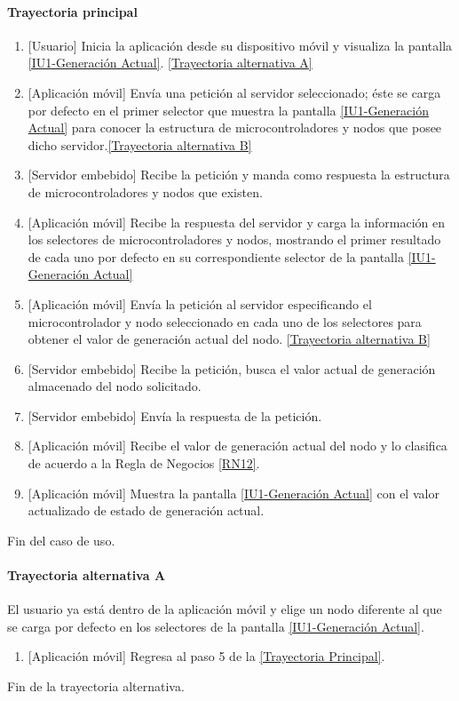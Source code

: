 \paragraph{Trayectoria principal}
    \label{SUB-U-CU1.1:TP}
	\begin{enumerate}
	    \item {[Usuario]} Inicia la aplicación desde su dispositivo móvil y visualiza la pantalla \hyperref[fig:monitoreoReal]{[IU1-Generación Actual]}. \hyperref[SUB-U-CU1.1:TA]{[Trayectoria alternativa A]}
	    \item {[Aplicación móvil]} Envía una petición al servidor seleccionado; éste se carga por defecto en el primer selector que muestra la pantalla \hyperref[fig:monitoreoReal]{[IU1-Generación Actual]} para conocer la estructura de microcontroladores y nodos que posee dicho servidor.\hyperref[SUB-U-CU1.1:TB]{[Trayectoria alternativa B]}
	    \item {[Servidor embebido]} Recibe la petición y manda como respuesta la estructura de microcontroladores y nodos que existen.
	    \item {[Aplicación móvil]} Recibe la respuesta del servidor y carga la información en los selectores de microcontroladores y nodos, mostrando el primer resultado de cada uno por defecto en su correspondiente selector de la pantalla \hyperref[fig:monitoreoReal]{[IU1-Generación Actual]} 
	    \item {[Aplicación móvil]} Envía la petición al servidor especificando el microcontrolador y nodo seleccionado en cada uno de los selectores para obtener el valor de generación actual del nodo. \hyperref[SUB-U-CU1.1:TB]{[Trayectoria alternativa B]} 
	    \item {[Servidor embebido]} Recibe la petición, busca el valor actual de generación almacenado del nodo solicitado. 
	    \item {[Servidor embebido]} Envía la respuesta de la petición.
	    \item {[Aplicación móvil]} Recibe el valor de generación actual del nodo y lo clasifica de acuerdo a la Regla de Negocios \ref{RN12}. 
	    \item {[Aplicación móvil]} Muestra la pantalla \hyperref[fig:monitoreoReal]{[IU1-Generación Actual]} con el valor actualizado de estado de generación actual.
	\end{enumerate}
	Fin del caso de uso.

\paragraph{Trayectoria alternativa A} \label{SUB-U-CU1.1:TA}
	El usuario ya está dentro de la aplicación móvil y elige un nodo diferente al que se carga por defecto en los selectores de la pantalla \hyperref[fig:monitoreoReal]{[IU1-Generación Actual]}.
	\begin{enumerate}[label=A\arabic*.]
		\item {[Aplicación móvil]} Regresa al paso 5 de la \hyperref[SUB-U-CU1.1:TP]{[Trayectoria Principal]}.
	\end{enumerate}
	Fin de la trayectoria alternativa.

